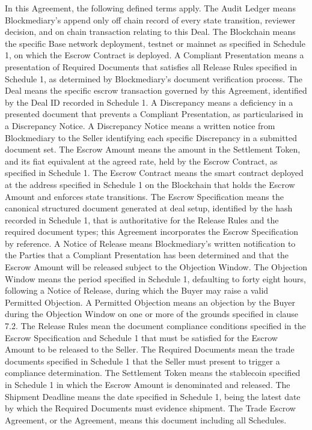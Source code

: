 \documentclass[12pt, a4paper]{article}
\begin{document}
In this Agreement, the following defined terms apply. The Audit Ledger means
Blockmediary's append only off chain record of every state transition, reviewer decision,
and on chain transaction relating to this Deal. The Blockchain means the specific
Base network deployment, testnet or mainnet as specified in Schedule 1, on which the
Escrow Contract is deployed. A Compliant Presentation means a presentation of Required
Documents that satisfies all Release Rules specified in Schedule 1, as determined by
Blockmediary's document verification process. The Deal means the specific escrow
transaction governed by this Agreement, identified by the Deal ID recorded in Schedule 1.
A Discrepancy means a deficiency in a presented document that prevents a Compliant
Presentation, as particularised in a Discrepancy Notice. A Discrepancy Notice means a
written notice from Blockmediary to the Seller identifying each specific Discrepancy in a
submitted document set. The Escrow Amount means the amount in the Settlement Token, and
its fiat equivalent at the agreed rate, held by the Escrow Contract, as specified in
Schedule 1. The Escrow Contract means the smart contract deployed at the address specified
in Schedule 1 on the Blockchain that holds the Escrow Amount and enforces state
transitions. The Escrow Specification means the canonical structured document generated at
deal setup, identified by the hash recorded in Schedule 1, that is authoritative for the
Release Rules and the required document types; this Agreement incorporates the Escrow
Specification by reference. A Notice of Release means Blockmediary's written notification
to the Parties that a Compliant Presentation has been determined and that the Escrow
Amount will be released subject to the Objection Window. The Objection Window means the
period specified in Schedule 1, defaulting to forty eight hours, following a Notice of
Release, during which the Buyer may raise a valid Permitted Objection. A Permitted
Objection means an objection by the Buyer during the Objection Window on one or more of
the grounds specified in clause 7.2. The Release Rules mean the document compliance
conditions specified in the Escrow Specification and Schedule 1 that must be satisfied for
the Escrow Amount to be released to the Seller. The Required Documents mean the trade
documents specified in Schedule 1 that the Seller must present to trigger a compliance
determination. The Settlement Token means the stablecoin specified in Schedule 1 in which
the Escrow Amount is denominated and released. The Shipment Deadline means the date
specified in Schedule 1, being the latest date by which the Required Documents must
evidence shipment. The Trade Escrow Agreement, or the Agreement, means this document
including all Schedules.
\end{document}
